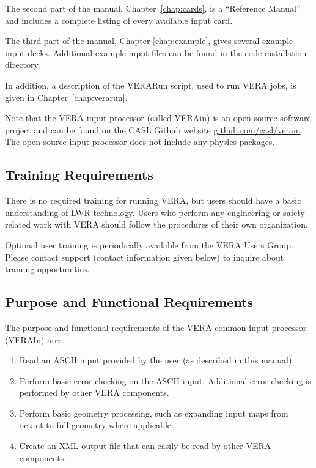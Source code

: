 The second part of the manual, Chapter~\ref{chap:cards}, is a ``Reference Manual'' and includes
a complete listing of every available input card.

The third part of the manual, Chapter \ref{chap:example}, gives several example input decks.
Additional example input files can be found in the code installation directory.

In addition, a description of the VERARun script, used to run VERA jobs, is given in Chapter~\ref{chap:verarun}.

Note that the VERA input processor (called VERAin) is an open source software project and can be
found on the CASL Github website \href{http://www.github.com/casl/verain}{github.com/casl/verain}.
The open source input processor does not include any physics packages.


\subsection{Training Requirements}

There is no required training for running VERA, but users should have a basic understanding
of LWR technology. Users who perform any engineering or safety related work with VERA should
follow the procedures of their own organization.

Optional user training is periodically available from the VERA Users Group.
Please contact support (contact information given below) to inquire about training opportunities.

\subsection{Purpose and Functional Requirements}

The purpose and functional requirements of the VERA common input processor (VERAIn) are:
\begin{enumerate}
\item Read an ASCII input provided by the user (as described in this manual).
\item Perform basic error checking on the ASCII input. Additional error checking is performed by
other VERA components.
\item Perform basic geometry processing, such as expanding input maps from octant to full geometry
where applicable.
\item Create an XML output file that can easily be read by other VERA components.
\end{enumerate}

